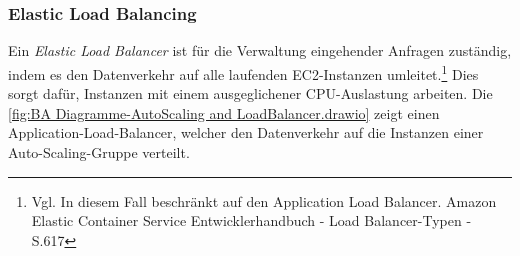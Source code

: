 \\\\
\subsubsection*{Elastic Load Balancing}
Ein \textit{Elastic Load Balancer} ist für die Verwaltung eingehender Anfragen zuständig, indem es den Datenverkehr auf alle laufenden EC2-Instanzen umleitet.\footnote{Vgl. In diesem Fall beschränkt auf den Application Load Balancer. Amazon Elastic Container Service Entwicklerhandbuch - Load Balancer-Typen - S.617\cite{AMZ39}} Dies sorgt dafür, Instanzen mit einem ausgeglichener CPU-Auslastung arbeiten. Die \autoref{fig:BA Diagramme-AutoScaling and LoadBalancer.drawio} zeigt einen Application-Load-Balancer, welcher den Datenverkehr auf die Instanzen einer Auto-Scaling-Gruppe verteilt.

